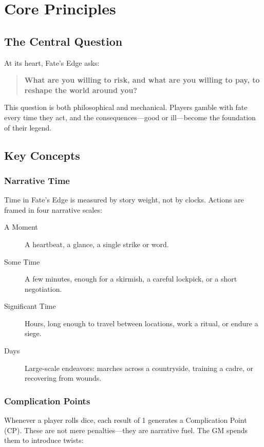 \chapter{Core Principles}

\section{The Central Question}

At its heart, Fate's Edge asks:
\begin{quote}
\textbf{What are you willing to risk, and what are you willing to pay, to reshape the world around you?}
\end{quote}

This question is both philosophical and mechanical. Players gamble with fate every time they act, and the consequences---good or ill---become the foundation of their legend.

\section{Key Concepts}

\subsection{Narrative Time}

Time in Fate's Edge is measured by story weight, not by clocks. Actions are framed in four narrative scales:

\begin{description}
\item[A Moment] A heartbeat, a glance, a single strike or word.
\item[Some Time] A few minutes, enough for a skirmish, a careful lockpick, or a short negotiation.
\item[Significant Time] Hours, long enough to travel between locations, work a ritual, or endure a siege.
\item[Days] Large-scale endeavors: marches across a countryside, training a cadre, or recovering from wounds.
\end{description}

\subsection{Complication Points}

Whenever a player rolls dice, each result of 1 generates a Complication Point (CP). These are not mere penalties---they are narrative fuel. The GM spends them to introduce twists:

